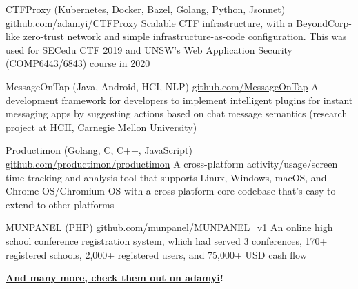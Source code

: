 \documentclass[hidelinks__VERSION__]{adamyi-cv}
\begin{document}
\begin{entrylist}


\entry
{CTFProxy (Kubernetes, Docker, Bazel, Golang, Python, Jsonnet)}
{\href{https://github.com/adamyi/CTFProxy}{github.com/adamyi/CTFProxy}}
{Scalable CTF infrastructure, with a BeyondCorp-like zero-trust network and simple infrastructure-as-code configuration. This was used for SECedu CTF 2019 and UNSW's Web Application Security (COMP6443/6843) course in 2020}


\entry
{MessageOnTap (Java, Android, HCI, NLP)}
{\href{https://github.com/MessageOnTap}{github.com/MessageOnTap}}
{A development framework for developers to implement intelligent plugins for instant messaging apps by suggesting actions based on chat message semantics (research project at HCII, Carnegie Mellon University)}


\entry
{Productimon (Golang, C, C++, JavaScript)}
{\href{https://github.com/productimon/productimon}{github.com/productimon/productimon}}
{A cross-platform activity/usage/screen time tracking and analysis tool that supports Linux, Windows, macOS, and Chrome OS/Chromium OS with a cross-platform core codebase that's easy to extend to other platforms}


\entry
{MUNPANEL (PHP)}
{\href{https://github.com/munpanel/MUNPANEL_v1}{github.com/munpanel/MUNPANEL\_v1}}
{An online high school conference registration system, which had served 3 conferences, 170+ registered schools, 2,000+ registered users, and 75,000+ USD cash flow}


\item[\textbf{\href{https://github.com/adamyi}{And many more, check them out on \faGithub \hspace{0.1em} adamyi}!}]

\end{entrylist}

\pagebreak

\end{document}
